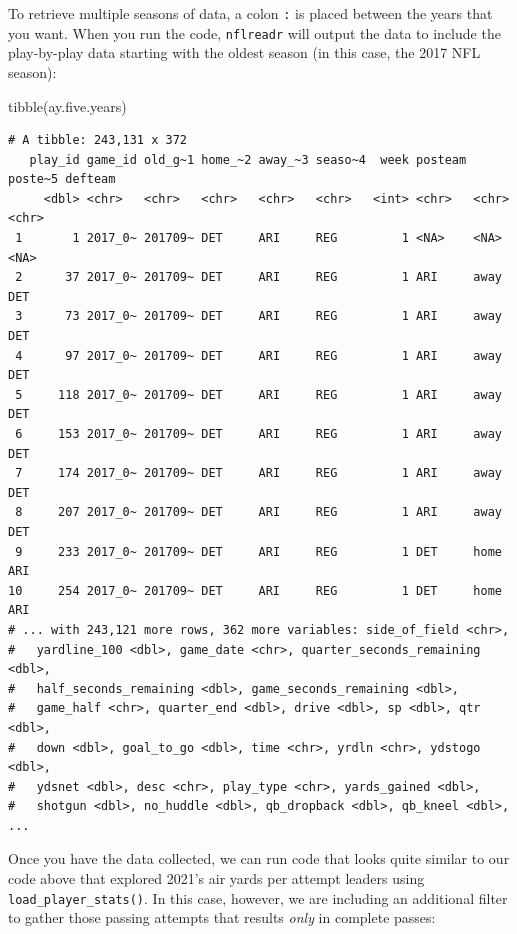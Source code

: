 \documentclass[
  letterpaper,
]{krantz}
\newenvironment{Shaded}{\begin{snugshade}}{\end{snugshade}}
\newcommand{\FunctionTok}[1]{\textcolor[rgb]{0.28,0.35,0.67}{#1}}
\newcommand{\NormalTok}[1]{\textcolor[rgb]{0.00,0.23,0.31}{#1}}
\begin{document}
To retrieve multiple seasons of data, a colon \texttt{:} is placed
between the years that you want. When you run the code,
\texttt{nflreadr} will output the data to include the play-by-play data
starting with the oldest season (in this case, the 2017 NFL season):

\begin{Shaded}
\begin{Highlighting}[]
\FunctionTok{tibble}\NormalTok{(ay.five.years)}
\end{Highlighting}
\end{Shaded}

\begin{verbatim}
# A tibble: 243,131 x 372
   play_id game_id old_g~1 home_~2 away_~3 seaso~4  week posteam poste~5 defteam
     <dbl> <chr>   <chr>   <chr>   <chr>   <chr>   <int> <chr>   <chr>   <chr>  
 1       1 2017_0~ 201709~ DET     ARI     REG         1 <NA>    <NA>    <NA>   
 2      37 2017_0~ 201709~ DET     ARI     REG         1 ARI     away    DET    
 3      73 2017_0~ 201709~ DET     ARI     REG         1 ARI     away    DET    
 4      97 2017_0~ 201709~ DET     ARI     REG         1 ARI     away    DET    
 5     118 2017_0~ 201709~ DET     ARI     REG         1 ARI     away    DET    
 6     153 2017_0~ 201709~ DET     ARI     REG         1 ARI     away    DET    
 7     174 2017_0~ 201709~ DET     ARI     REG         1 ARI     away    DET    
 8     207 2017_0~ 201709~ DET     ARI     REG         1 ARI     away    DET    
 9     233 2017_0~ 201709~ DET     ARI     REG         1 DET     home    ARI    
10     254 2017_0~ 201709~ DET     ARI     REG         1 DET     home    ARI    
# ... with 243,121 more rows, 362 more variables: side_of_field <chr>,
#   yardline_100 <dbl>, game_date <chr>, quarter_seconds_remaining <dbl>,
#   half_seconds_remaining <dbl>, game_seconds_remaining <dbl>,
#   game_half <chr>, quarter_end <dbl>, drive <dbl>, sp <dbl>, qtr <dbl>,
#   down <dbl>, goal_to_go <dbl>, time <chr>, yrdln <chr>, ydstogo <dbl>,
#   ydsnet <dbl>, desc <chr>, play_type <chr>, yards_gained <dbl>,
#   shotgun <dbl>, no_huddle <dbl>, qb_dropback <dbl>, qb_kneel <dbl>, ...
\end{verbatim}

Once you have the data collected, we can run code that looks quite
similar to our code above that explored 2021's air yards per attempt
leaders using \texttt{load\_player\_stats()}. In this case, however, we
are including an additional filter to gather those passing attempts that
results \emph{only} in complete passes:
\end{document}
